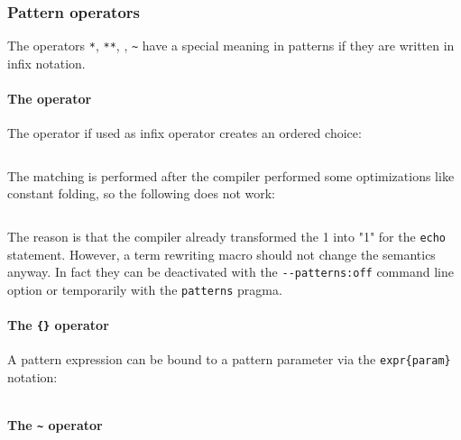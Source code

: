 \begin{verbatim}
\end{verbatim}

\hypertarget{pattern-operators}{%
\subsubsection{Pattern operators}\label{pattern-operators}}

The operators \texttt{*}, \texttt{**}, \texttt{\textbar{}},
\texttt{\textasciitilde{}} have a special meaning in patterns if they
are written in infix notation.

\hypertarget{the-operator}{%
\paragraph{\texorpdfstring{The \texttt{\textbar{}}
operator}{The \textbar{} operator}}\label{the-operator}}

The \texttt{\textbar{}} operator if used as infix operator creates an
ordered choice:

\begin{verbatim}
\end{verbatim}

The matching is performed after the compiler performed some
optimizations like constant folding, so the following does not work:

\begin{verbatim}
\end{verbatim}

The reason is that the compiler already transformed the 1 into "1" for
the \texttt{echo} statement. However, a term rewriting macro should not
change the semantics anyway. In fact they can be deactivated with the
\texttt{-\/-patterns:off} command line option or temporarily with the
\texttt{patterns} pragma.

\hypertarget{the-operator-1}{%
\paragraph{\texorpdfstring{The \texttt{\{\}}
operator}{The \{\} operator}}\label{the-operator-1}}

A pattern expression can be bound to a pattern parameter via the
\texttt{expr\{param\}} notation:

\begin{verbatim}
\end{verbatim}

\hypertarget{the-operator-2}{%
\paragraph{\texorpdfstring{The \texttt{\textasciitilde{}}
operator}{The \textasciitilde{} operator}}\label{the-operator-2}}

